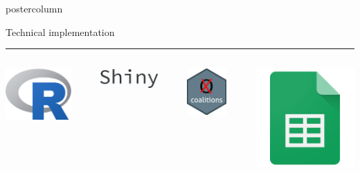\documentclass[final,hyperref={pdfpagelabels=false}]{beamer}
\newcommand*\circled[1]{\tikz[baseline=(char.base)]{
\node[shape=circle,draw,inner sep=2pt] (char) {#1};}}
\begin{document}
\begin{frame}
\begin{columns}
\begin{column}{1\textwidth}
\begin{columns}[T]
\begin{column}{.484\textwidth}
\begin{beamercolorbox}[center,wd=\textwidth]{postercolumn}
\begin{minipage}[T]{.95\textwidth}
\begin{block}{\footnotesize \circled{3} Technical implementation}
\vspace{1ex}
\textcolor{LMUlightgray}{\hrule{\linewidth}}
\vspace{1ex}
\begin{columns}[t]
  \begin{column}{.15\textwidth}
  \begin{center}
  \includegraphics[height=5ex]{figures/implementation_r}
  \end{center}
  \end{column}

  \hspace{-1.5ex}
  \textcolor{LMUlightgray}{\vrule{}}
  \hspace{1.5ex}

  \begin{column}{.15\textwidth}
  \begin{center}
  \vspace{1ex}
  \includegraphics[height=3ex]{figures/implementation_shiny}
  \end{center}
  \end{column}

  \hspace{-1.5ex}
  \textcolor{LMUlightgray}{\vrule{}}
  \hspace{1.5ex}

  \begin{column}{.15\textwidth}
  \begin{center}
  \includegraphics[height=5ex]{figures/implementation_coalitions}
  \end{center}
  \end{column}

  \hspace{-1.5ex}
  \textcolor{LMUlightgray}{\vrule{}}
  \hspace{1.5ex}

  \begin{column}{.15\textwidth}
  \begin{center}
  \includegraphics[height=5ex]{figures/implementation_sheets}
  \end{center}
  \end{column}


\end{columns}
\end{block}
\end{minipage}
\end{beamercolorbox}
\end{column}
\end{columns}
\end{column}
\end{columns}
\end{frame}
\end{document}
